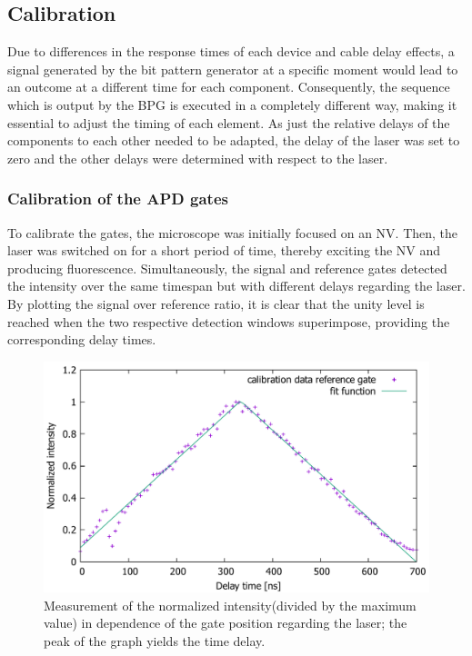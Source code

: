 \documentclass[12pt,a4paper]{article}
\begin{document}
\subsection{Calibration}
Due to differences in the response times of each device and cable delay effects, a signal generated by the bit pattern generator at a specific moment would lead to an outcome at a different time for each component. Consequently, the sequence which is output by the BPG is executed in a completely different way, making it essential to adjust the timing of each element. As just the relative delays of the components to each other needed to be adapted, the delay of the laser was set to zero and the other delays were determined with respect to the laser.
\subsubsection{Calibration of the APD gates}
To calibrate the gates, the microscope was initially focused on an NV. Then, the laser was switched on for a short period of time, thereby exciting the NV and producing fluorescence. Simultaneously, the signal and reference gates detected the intensity over the same timespan but with different delays regarding the laser. By plotting the signal over reference ratio, it is clear that the unity level is reached  when the two respective detection windows superimpose, providing the corresponding delay times.
\begin{figure}[H]
\centering
\includegraphics[scale=0.5]{gatestiming.pdf} 
\caption{Measurement of the normalized intensity(divided by the maximum value) in dependence of the gate position regarding the laser; the peak of the graph yields the time delay.}
\label{gt}
\end{figure}
\end{document}
